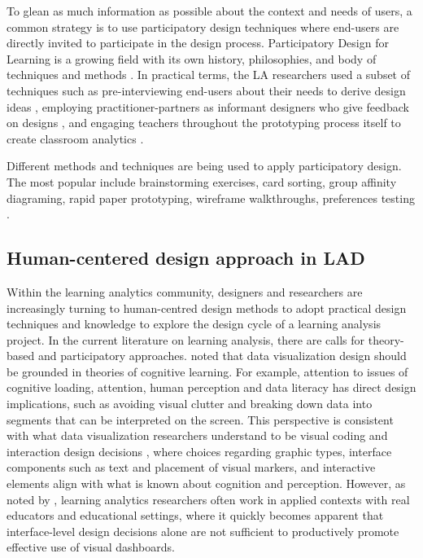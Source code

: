 \documentclass[preprint,12pt]{elsarticle}
\begin{document}
To glean as much information as possible about the context and needs of users, 
a common strategy is to use participatory design techniques where end-users are directly invited to participate in the design process. 
Participatory Design for Learning is a growing field with its own history, philosophies, and body of techniques and methods \cite{disalvo2017participatory}. In practical terms, the LA researchers used a subset of techniques such as pre-interviewing end-users about 
their needs to derive design ideas \cite{xhakaj2016teachers}, employing practitioner-partners as informant designers who give feedback on 
designs \cite{fiorini2018application}, and engaging teachers throughout the prototyping process itself to create classroom analytics \cite{holstein2018classroom}.

Different methods and techniques are being used to apply participatory design. The most popular include brainstorming exercises, card sorting, group affinity diagraming, rapid paper prototyping, wireframe walkthroughs, preferences testing \cite{abel2013cross}. 

\subsection{Human-centered design approach in LAD}
Within the learning analytics community, designers and researchers are increasingly turning to human-centred design methods to adopt practical design techniques and knowledge to explore the design cycle of a learning analysis project. In the current literature on learning analysis, there are calls for theory-based and participatory approaches. \citet{alhadad2018visualizing}  noted that data visualization design should be grounded in theories of cognitive learning. For example, attention to issues of cognitive loading, attention, human perception and data literacy has direct design implications, such as avoiding visual clutter and breaking down data into segments that can be interpreted on the screen. This perspective is consistent with what data visualization researchers understand to be visual coding and interaction design decisions \citep{munzner2014visualization}, where choices regarding graphic types, interface components such as text and placement of visual markers, and interactive elements align with what is known about cognition and perception.
However, as noted by \citet{dollinger2018co}, learning analytics researchers often work in applied contexts with real educators and educational settings, where it quickly becomes apparent that interface-level design decisions alone are not sufficient to productively promote effective use of visual dashboards. 
\end{document}

